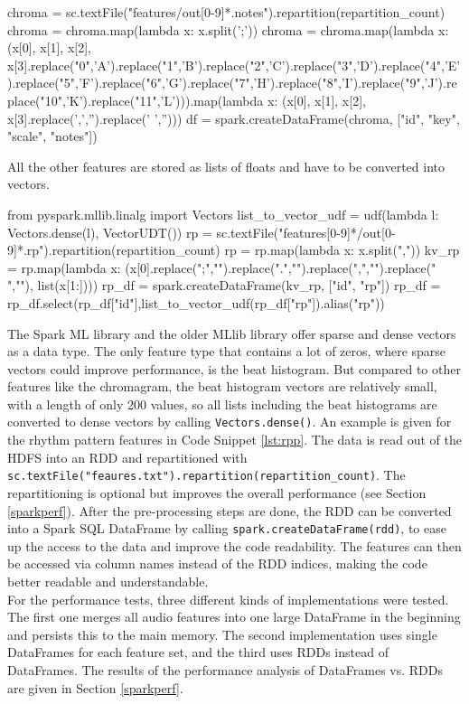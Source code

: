 \begin{pythonCode}[frame=single,label={lst:prep1},caption={Notes preprocessing},captionpos=b]
chroma = sc.textFile("features/out[0-9]*.notes").repartition(repartition_count)
chroma = chroma.map(lambda x: x.split(';'))
chroma = chroma.map(lambda x: (x[0], x[1], x[2], x[3].replace("0",'A').replace("1",'B').replace("2",'C').replace("3",'D').replace("4",'E').replace("5",'F').replace("6",'G').replace("7",'H').replace("8",'I').replace("9",'J').replace("10",'K').replace("11",'L'))).map(lambda x: (x[0], x[1], x[2], x[3].replace(',','').replace(' ','')))
df = spark.createDataFrame(chroma, ["id", "key", "scale", "notes"])
\end{pythonCode}

\noindent All the other features are stored as lists of floats and have to be converted into vectors. 

\begin{pythonCode}[frame=single,label={lst:rpp},caption={Rhythm patterns preprocessing},captionpos=b]
from pyspark.mllib.linalg import Vectors
list_to_vector_udf = udf(lambda l: Vectors.dense(l), VectorUDT())
rp = sc.textFile("features[0-9]*/out[0-9]*.rp").repartition(repartition_count)
rp = rp.map(lambda x: x.split(","))
kv_rp = rp.map(lambda x: (x[0].replace(";","").replace(".","").replace(",","").replace(" ",""), list(x[1:])))
rp_df = spark.createDataFrame(kv_rp, ["id", "rp"])
rp_df = rp_df.select(rp_df["id"],list_to_vector_udf(rp_df["rp"]).alias("rp"))
\end{pythonCode}

\noindent The Spark ML library and the older MLlib library offer sparse and dense vectors as a data type. The only feature type that contains a lot of zeros, where sparse vectors could improve performance, is the beat histogram. But compared to other features like the chromagram, the beat histogram vectors are relatively small, with a length of only 200 values, so all lists including the beat histograms are converted to dense vectors by calling \lstinline{Vectors.dense()}. 
\noindent An example is given for the rhythm pattern features in Code Snippet \ref{lst:rpp}. The data is read out of the HDFS into an RDD and repartitioned with \lstinline{sc.textFile("feaures.txt").repartition(repartition_count)}. The repartitioning is optional but improves the overall performance (see Section \ref{sparkperf}). After the pre-processing steps are done, the RDD can be converted into a Spark SQL DataFrame by calling \lstinline{spark.createDataFrame(rdd)}, to ease up the access to the data and improve the code readability. The features can then be accessed via column names instead of the RDD indices, making the code better readable and understandable.\\
For the performance tests, three different kinds of implementations were tested. The first one merges all audio features into one large DataFrame in the beginning and persists this to the main memory. The second implementation uses single DataFrames for each feature set, and the third uses RDDs instead of DataFrames. The results of the performance analysis of DataFrames vs. RDDs are given in Section \ref{sparkperf}.

